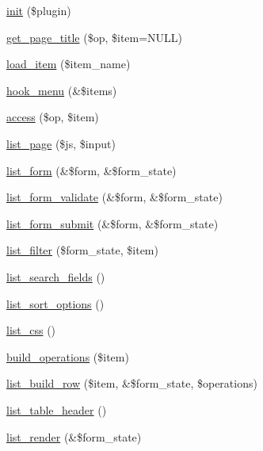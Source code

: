 \begin{DoxyCompactItemize}
\item 
\hyperlink{classctools__export__ui_a6e2c9b8dca7d4f8ec8d7badaa1b51f48}{init} (\$plugin)
\item 
\hyperlink{classctools__export__ui_a3c6299f72efaea4ce135f91153ad36ba}{get\_\-page\_\-title} (\$op, \$item=NULL)
\item 
\hyperlink{classctools__export__ui_ab6ae2bbcbfa46949bd9fc14284bba061}{load\_\-item} (\$item\_\-name)
\item 
\hyperlink{classctools__export__ui_a5ee980ee59378fdeb612e429e18f08c7}{hook\_\-menu} (\&\$items)
\item 
\hyperlink{classctools__export__ui_a2969ae536055dec201470f76f107450b}{access} (\$op, \$item)
\item 
\hyperlink{classctools__export__ui_af0783238d93c1d94fdd86cf9d2f24d21}{list\_\-page} (\$js, \$input)
\item 
\hyperlink{classctools__export__ui_a238e12ec5bfd7325bebad4f6261b6fa5}{list\_\-form} (\&\$form, \&\$form\_\-state)
\item 
\hyperlink{classctools__export__ui_a81aa45747a851effe95011e74d32b9dd}{list\_\-form\_\-validate} (\&\$form, \&\$form\_\-state)
\item 
\hyperlink{classctools__export__ui_a292ee9ad95b3e693266bdb0766dda733}{list\_\-form\_\-submit} (\&\$form, \&\$form\_\-state)
\item 
\hyperlink{classctools__export__ui_aed7f3b1a8d7564168f89e2b450c6aa4a}{list\_\-filter} (\$form\_\-state, \$item)
\item 
\hyperlink{classctools__export__ui_a6f977dc0c413c1b4a02e0846d9416598}{list\_\-search\_\-fields} ()
\item 
\hyperlink{classctools__export__ui_ad9839b337e16e3c782eab7967550d3a1}{list\_\-sort\_\-options} ()
\item 
\hyperlink{classctools__export__ui_ae6d91d7aac792252de261ad9efea94c9}{list\_\-css} ()
\item 
\hyperlink{classctools__export__ui_adb903ed8cca456e7ca48bf91fffff481}{build\_\-operations} (\$item)
\item 
\hyperlink{classctools__export__ui_ad72f3d7170f48e0d0cb1dacb2926bb78}{list\_\-build\_\-row} (\$item, \&\$form\_\-state, \$operations)
\item 
\hyperlink{classctools__export__ui_a01b1219535377db871132934f806b8a0}{list\_\-table\_\-header} ()
\item 
\hyperlink{classctools__export__ui_aa9f27b96c434495b0d56abf6cdc72346}{list\_\-render} (\&\$form\_\-state)

\end{DoxyCompactItemize}
